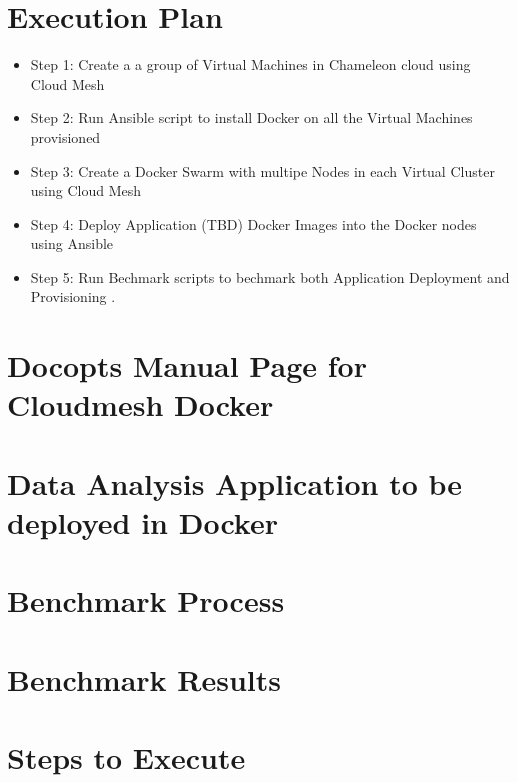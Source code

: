 \documentclass[9pt,twocolumn,twoside]{../../styles/osajnl}
\begin{document}
\section{Execution Plan}

\begin{itemize}
\item Step 1: Create a a group of Virtual Machines in Chameleon cloud using Cloud Mesh
 
\item Step 2: Run Ansible script to install Docker on all the Virtual Machines provisioned

\item Step 3: Create a Docker Swarm with multipe Nodes in each Virtual Cluster using Cloud Mesh

\item Step 4: Deploy Application (TBD) Docker Images into the Docker nodes using Ansible

\item Step 5: Run Bechmark scripts to bechmark both Application Deployment and Provisioning .

\end{itemize}

\section{Docopts Manual Page for Cloudmesh Docker}


\section{Data Analysis Application to be deployed in Docker}


\section{Benchmark Process}


\section{Benchmark Results}


\section{Steps to Execute}





 


\newpage

\appendix
\end{document}
